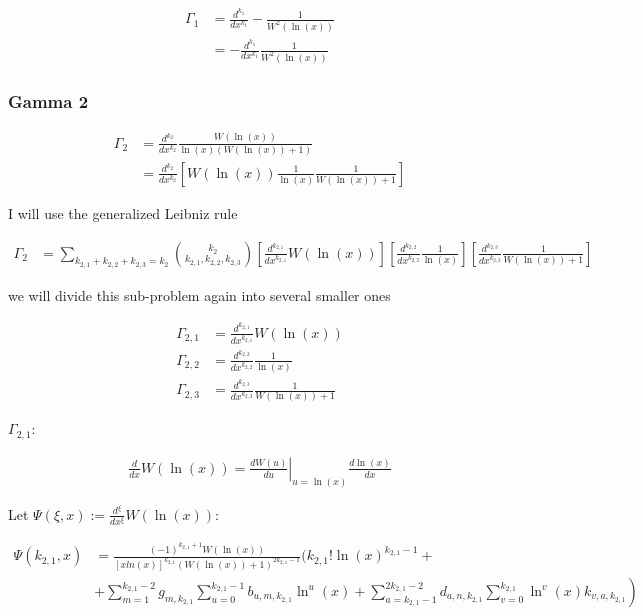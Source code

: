 \begin{align}
      \Gamma_1 &= \frac{d^{k_1}}{dx^{k_1}}-\frac{1}{W^2(\ln(x))} \\
      &=-\frac{d^{k_1}}{dx^{k_1}}\frac{1}{W^2(\ln(x))}
\end{align}

\subsubsection{Gamma 2}

\begin{align}
      \Gamma_2 &= \frac{d^{k_2}}{dx^{k_2}}\frac{W(\ln(x))}{\ln(x)(W(\ln(x))+1)} \\
      &=\frac{d^{k_2}}{dx^{k_2}} \left[W(\ln(x)) \frac{1}{\ln(x)}\frac{1}{W(\ln(x))+1}\right]
\end{align}

I will use the generalized Leibniz rule

\begin{align}
      \Gamma_2 &= \sum_{k_{2, 1}+k_{2, 2}+k_{2, 3}=k_2}\binom{k_2}{k_{2, 1}, k_{2, 2}, k_{2, 3}}
      \left[\frac{d^{k_{2, 1}}}{dx^{k_{2, 1}}}W(\ln(x))\right]\left[ \frac{d^{k_{2, 2}}}{dx^{k_{2, 2}}}
      \frac{1}{\ln(x)}\right]\left[\frac{d^{k_{2, 3}}}{dx^{k_{2, 3}}}\frac{1}{W(\ln(x))+1}\right]
\end{align}

we will divide this sub-problem again into several smaller ones

\begin{align}
      \Gamma_{2, 1} &=\frac{d^{k_{2, 1}}}{dx^{k_{2, 1}}}W(\ln(x)) \\
      \Gamma_{2, 2} & = \frac{d^{k_{2, 2}}}{dx^{k_{2, 2}}}\frac{1}{\ln(x)} \\
      \Gamma_{2, 3} & = \frac{d^{k_{2, 3}}}{dx^{k_{2, 3}}}\frac{1}{W(\ln(x))+1}
\end{align}

\(\Gamma_{2, 1}\):

\begin{align}
      \frac{d}{dx}W(\ln(x)) = \left.\frac{dW(u)}{du}\right|_{u=\ln(x)}\frac{d\ln(x)}{dx}
\end{align}

Let \(\Psi(\xi, x) := \frac{d^\xi}{dx^\xi}W(\ln(x))\):

\begin{align}
      \Psi(k_{2, 1}, x) &= \frac{(-1)^{k_{2, 1}+1}W(\ln(x))}{[xln(x)]^{k_{2, 1}}
      (W(\ln(x))+1)^{2k_{2, 1}-1}}\Bigg(k_{2, 1}!\ln(x)^{k_{2, 1}-1}+\\ 
      & \left.+\sum^{k_{2, 1}-2}_{m=1}g_{m, k_{2, 1}}\sum_{u=0}^{k_{2, 1}
      -1}b_{u, m, k_{2, 1}}\ln^u(x)+\sum_{a=k_{2, 1}-1}^{2k_{2, 1}-2}d_{a, 
      n, k_{2, 1}}\sum_{v=0}^{k_{2, 1}}\ln^v(x)k_{v, a, k_{2, 1}}\right)
\end{align}

